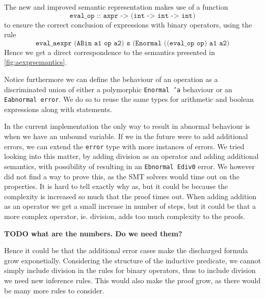 The new and improved semantic representation makes use of a function
\[
  \texttt{eval\_op :: axpr -> (int -> int -> int)}
\]
to ensure the correct conclusion of expressions with binary operators, using the rule
\[
  \texttt{eval\_aexpr (ABin a1 op a2) s (Enormal ((eval\_op op) a1 a2)}
\]
Hence we get a direct correspondence to the semantics presented in
\autoref{fig:aexprsemantics}.



Notice furthermore we can define the behaviour of an operation as a discriminated union of
either a polymorphic \texttt{Enormal 'a} behaviour or an \texttt{Eabnormal error}.
We do so to reuse the same types for arithmetic and boolean expressions along with statements.

In the current implementation the only way to result in abnormal behaviour is when we have an unbound variable.
If we in the future were to add additional errors, we can extend the \texttt{error} type with more
instances of errors.
We tried looking into this matter, by adding division as an operator and adding additional semantics,
with possibility of resulting in an \texttt{Ebnormal Ediv0} error. We however did not find a way to prove this,
as the SMT solvers would time out on the properties. It is hard to tell exactly why as, but it
could be because the complexity is increased so much that the proof times out.
When adding addition as an operator we get a small increase in number of steps, but it could be
that a more complex operator, ie. division, adds too much complexity to the proofs.

\textbf{TODO what are the numbers. Do we need them?}

Hence it could be that the additional error cases make the discharged formula grow
exponetially.
Considering the structure of the inductive predicate, we cannot simply include division in the
rules for binary operators, thus to include division we need new inference rules.
This would also make the proof grow, as there would be many more rules to consider.

